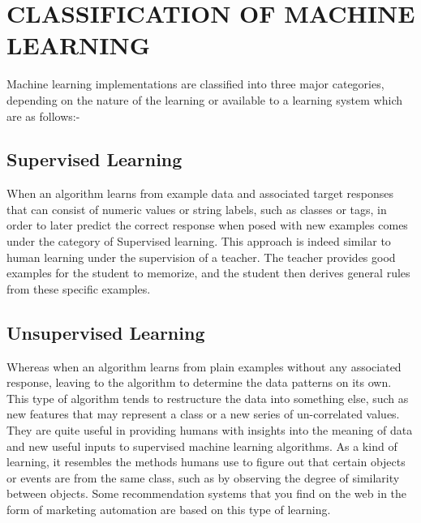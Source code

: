 \documentclass[12pt]{article}
\begin{document}
{\section{CLASSIFICATION OF MACHINE LEARNING}
%
Machine learning implementations are classified into three major categories, depending on the nature of the learning  or  available to a learning system which are as follows:-
\subsection{Supervised Learning}
When an algorithm learns from example data and associated target responses that can consist of numeric values or string labels, such as classes or tags, in order to later predict the correct response when posed with new examples comes under the category of Supervised learning. This approach is indeed similar to human learning under the supervision of a teacher. The teacher provides good examples for the student to memorize, and the student then derives general rules from these specific examples.

\subsection{Unsupervised Learning}
Whereas when an algorithm learns from plain examples without any associated response, leaving to the algorithm to determine the data patterns on its own. This type of algorithm tends to restructure the data into something else, such as new features that may represent a class or a new series of un-correlated values. They are quite useful in providing humans with insights into the meaning of data and new useful inputs to supervised machine learning algorithms. As a kind of learning, it resembles the methods humans use to figure out that certain objects or events are from the same class, such as by observing the degree of similarity between objects. Some recommendation systems that you find on the web in the form of marketing automation are based on this type of learning.

}
\end{document}
